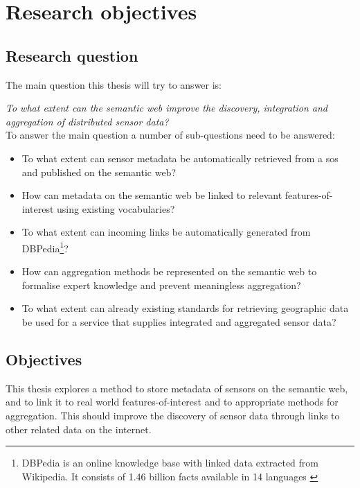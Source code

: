 
\section{Research objectives}
\label{chap:objectives}


\subsection{Research question} 
The main question this thesis will try to answer is: 

\textit{To what extent can the semantic web improve the discovery, integration and aggregation of distributed sensor data?}\\

To answer the main question a number of sub-questions need to be answered:
\begin{itemize}
	\item To what extent can sensor metadata be automatically retrieved from a \ac{sos} and published on the semantic web?
	\item How can metadata on the semantic web be linked to relevant features-of-interest using existing vocabularies?
	\item To what extent can incoming links be automatically generated from DBPedia\footnote{DBPedia is an online knowledge base with linked data extracted from Wikipedia. It consists of 1.46 billion facts available in 14 languages \citep{LD:DBPedia}}?
	\item How can aggregation methods be represented on the semantic web to formalise expert knowledge and prevent meaningless aggregation?
	\item To what extent can already existing standards for retrieving geographic data be used for a service that supplies integrated and aggregated sensor data?
\end{itemize}

\subsection{Objectives}

This thesis explores a method to store metadata of sensors on the semantic web, and to link it to real world features-of-interest and to appropriate methods for aggregation. This should improve the discovery of sensor data through links to other related data on the internet.  

